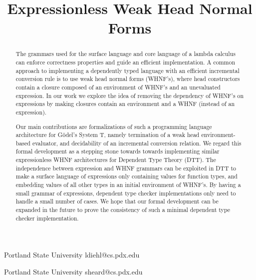 \documentclass[preprint,authoryear]{sigplanconf}
\begin{document}
\setlength{\pdfpageheight}{\paperheight}
\setlength{\pdfpagewidth}{\paperwidth}






\title{Expressionless Weak Head Normal Forms}

           {Portland State University}
           {ldiehl@cs.pdx.edu}

           {Portland State University}
           {sheard@cs.pdx.edu}

\maketitle

\begin{abstract}
The grammars used for the surface language and core language of a lambda
calculus can enforce correctness properties and guide an efficient
implementation. A common approach to implementing a dependently typed
language with an efficient incremental conversion rule is to use
weak head normal forms (WHNF's), where head constructors contain a closure
composed of an environment of WHNF's and an unevaluated expression. In
our work we explore the idea of removing the dependency of WHNF's on
expressions by making closures contain an environment and a WHNF
(instead of an expression).

Our main contributions are formalizations
of such a programming language architecture for G{\"o}del's System T,
namely termination of a weak head environment-based evaluator, and
decidability of an incremental conversion relation. We regard this
formal development as a stepping stone towards towards implementing
similar expressionless WHNF architectures for Dependent Type Theory (DTT).
The independence between expression and WHNF grammars can be exploited
in DTT to make a surface language of expressions only containing
values for function types, and embedding values of all other types in
an initial environment of WHNF's. By having a small grammar of
expressions, dependent type checker implementations only need to
handle a small number of cases. We hope that our formal development
can be expanded in the future to prove the consistency of such a
minimal dependent type checker implementation.
\end{abstract}
\end{document}
